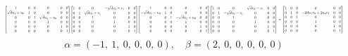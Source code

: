 \documentclass[11pt]{article}
\theoremstyle{definition}
\begin{document}
\[
\scaletoalign{\textwidth}{{\left[\begin{matrix}1 & 0 & 0 & 0 & 0 & 0\\\sqrt{d} u_{1} + u_{0} & 1 & 0 & 0 & 0 & 0\\0 & 0 & 1 & \sqrt{d} u_{1} - u_{0} & 0 & 0\\0 & 0 & 0 & 1 & 0 & 0\\0 & 0 & 0 & 0 & 1 & 0\\0 & 0 & 0 & 0 & 0 & 1\end{matrix}\right]} {\left[\begin{matrix}1 & 0 & 0 & - \sqrt{d} v_{0} + v_{1} & 0 & 0\\0 & 1 & \sqrt{d} v_{0} + v_{1} & 0 & 0 & 0\\0 & 0 & 1 & 0 & 0 & 0\\0 & 0 & 0 & 1 & 0 & 0\\0 & 0 & 0 & 0 & 1 & 0\\0 & 0 & 0 & 0 & 0 & 1\end{matrix}\right]} {\left[\begin{matrix}1 & 0 & 0 & 0 & 0 & 0\\- \sqrt{d} u_{1} - u_{0} & 1 & 0 & 0 & 0 & 0\\0 & 0 & 1 & - \sqrt{d} u_{1} + u_{0} & 0 & 0\\0 & 0 & 0 & 1 & 0 & 0\\0 & 0 & 0 & 0 & 1 & 0\\0 & 0 & 0 & 0 & 0 & 1\end{matrix}\right]} {\left[\begin{matrix}1 & 0 & 0 & \sqrt{d} v_{0} - v_{1} & 0 & 0\\0 & 1 & - \sqrt{d} v_{0} - v_{1} & 0 & 0 & 0\\0 & 0 & 1 & 0 & 0 & 0\\0 & 0 & 0 & 1 & 0 & 0\\0 & 0 & 0 & 0 & 1 & 0\\0 & 0 & 0 & 0 & 0 & 1\end{matrix}\right]} = {\left[\begin{matrix}1 & 0 & 0 & 0 & 0 & 0\\0 & 1 & 0 & - 2 d u_{1} v_{0} + 2 u_{0} v_{1} & 0 & 0\\0 & 0 & 1 & 0 & 0 & 0\\0 & 0 & 0 & 1 & 0 & 0\\0 & 0 & 0 & 0 & 1 & 0\\0 & 0 & 0 & 0 & 0 & 1\end{matrix}\right]}}
\]
\[
\alpha = \left( -1, \  1, \  0, \  0, \  0, \  0\right), \quad \beta = \left( 2, \  0, \  0, \  0, \  0, \  0\right)
\]
\end{document}
